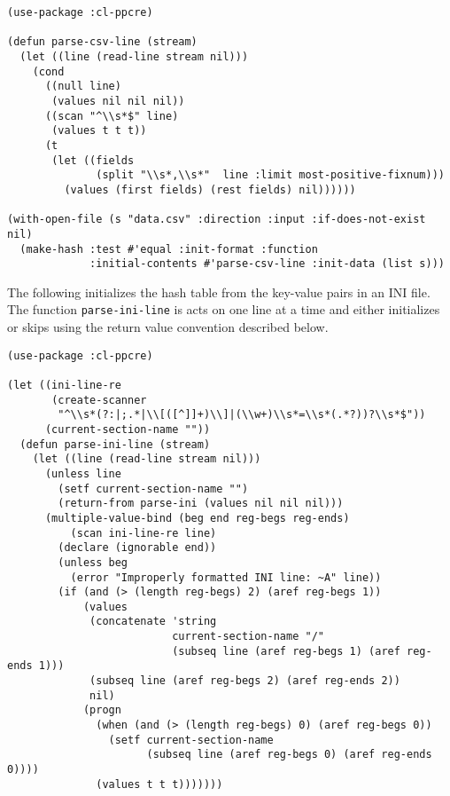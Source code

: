 \documentclass[11pt]{article}
\begin{document}
\begin{enumerate}
\begin{verbatim}
(use-package :cl-ppcre)

(defun parse-csv-line (stream)
  (let ((line (read-line stream nil)))
    (cond
      ((null line)
       (values nil nil nil))
      ((scan "^\\s*$" line)
       (values t t t))
      (t
       (let ((fields
              (split "\\s*,\\s*"  line :limit most-positive-fixnum)))
         (values (first fields) (rest fields) nil))))))

(with-open-file (s "data.csv" :direction :input :if-does-not-exist nil)
  (make-hash :test #'equal :init-format :function
             :initial-contents #'parse-csv-line :init-data (list s)))
\end{verbatim}




     The following initializes the hash table from the key-value pairs in an
     INI file. The function \texttt{parse-ini-line} is acts on one line at a time and
     either initializes or skips using the return value convention described
     below.


\begin{verbatim}
(use-package :cl-ppcre)

(let ((ini-line-re
       (create-scanner
        "^\\s*(?:|;.*|\\[([^]]+)\\]|(\\w+)\\s*=\\s*(.*?))?\\s*$"))
      (current-section-name ""))
  (defun parse-ini-line (stream)
    (let ((line (read-line stream nil)))
      (unless line
        (setf current-section-name "")
        (return-from parse-ini (values nil nil nil)))
      (multiple-value-bind (beg end reg-begs reg-ends)
          (scan ini-line-re line)
        (declare (ignorable end))
        (unless beg
          (error "Improperly formatted INI line: ~A" line))
        (if (and (> (length reg-begs) 2) (aref reg-begs 1))
            (values
             (concatenate 'string
                          current-section-name "/"
                          (subseq line (aref reg-begs 1) (aref reg-ends 1)))
             (subseq line (aref reg-begs 2) (aref reg-ends 2))
             nil)
            (progn
              (when (and (> (length reg-begs) 0) (aref reg-begs 0))
                (setf current-section-name
                      (subseq line (aref reg-begs 0) (aref reg-ends 0))))
              (values t t t)))))))


\end{verbatim}
\end{enumerate}
\end{document}
